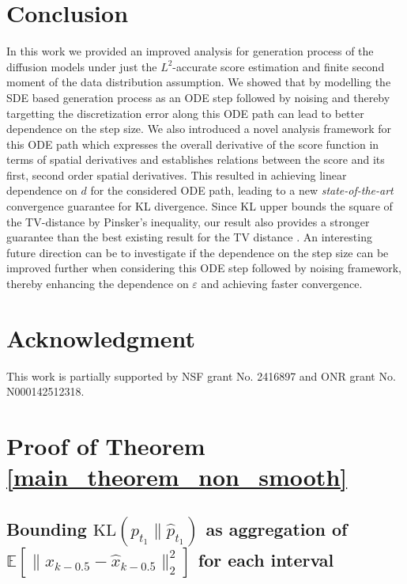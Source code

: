 \documentclass{article}
\newcommand{\KL}[2]{\mathrm{KL}\left(#1 \big\| #2\right)}
\begin{document}
\section{Conclusion}
{In this work we provided an improved analysis for generation process of the diffusion models under just the $L^2$-accurate score estimation and finite second moment of the data distribution assumption. We showed that by modelling the SDE based generation process as an ODE step followed by noising  and thereby targetting the discretization error along this ODE path can lead to better dependence on the step size. We also introduced a novel analysis framework for this ODE path which expresses the overall derivative of the score function in terms of spatial derivatives and establishes relations between the score and its first, second order spatial derivatives. This resulted in achieving linear dependence on $d$ for the considered ODE path, leading to a new \textit{state-of-the-art} convergence guarantee for KL divergence. Since KL upper bounds the square of the TV-distance by Pinsker's inequality, our result also provides a stronger guarantee than the best existing result for the TV distance \cite{li2024d}. 
An interesting future direction can be to investigate if the dependence on the step size can be improved further when considering this ODE step followed by noising framework, thereby enhancing the dependence on $\varepsilon$ and achieving faster convergence.}

\section*{Acknowledgment}
\noindent
This work is partially supported by NSF grant No. 2416897 and ONR grant No. N000142512318.

{\small


}

\newpage
\tableofcontents
\appendix

\newpage

\section{Proof of Theorem \ref{main_theorem_non_smooth}}



\subsection{Bounding $\KL{p_{t_1}}{\hat{p}_{t_1}}$ as aggregation of $\mathbb{E}[\|x_{k-0.5}- \hat{x}_{k-0.5}\|^2_2]$ for each interval}
\label{wass_kl_subsec}
\end{document}
